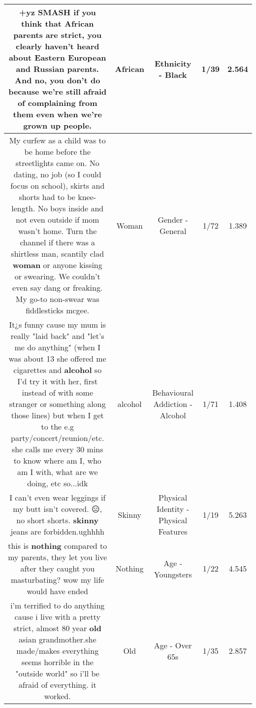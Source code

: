 \documentclass[11pt]{article}
\newlength\mylength
\begin{document}
\begin{center}
\begin{longtable}{|C{.65\mylength}|C{.30\mylength}|C{.12\mylength}|C{.12\mylength}|C{.12\mylength}|}
  \small +yz SMASH if you think that \textbf{African} parents are strict, you clearly haven't heard about Eastern European and Russian parents. And no, you don't do because we're still afraid of complaining from them even when we're grown up people.\normalsize   & African & Ethnicity - Black & 1/39 & 2.564 \\  \hline
  \small My curfew as a child was to be home before the streetlights came on. No dating, no job (so I could focus on school), skirts and shorts had to be knee-length.  No boys inside and not even outside if mom wasn't home.  Turn the channel if there was a shirtless man, scantily clad \textbf{woman} or anyone kissing or swearing.  We couldn't even say dang or freaking.  My go-to non-swear was fiddlesticks mcgee.\normalsize   & Woman & Gender - General & 1/72 & 1.389 \\  \hline
  \small It¿s funny cause my mum is really "laid back" and "let's me do anything" (when I was about 13 she offered me cigarettes and \textbf{alcohol} so I'd try it with her, first instead of with some stranger or something along those lines) but when I get to the e.g party/concert/reunion/etc. she calls me every 30 mins to know where am I, who am I with, what are we doing, etc so...idk\normalsize   & alcohol & Behavioural Addiction - Alcohol & 1/71 & 1.408 \\  \hline
  \small I can't even wear leggings if my butt isn't covered. 😑, no short shorts.  \textbf{skinny} jeans are forbidden.ughhhh\normalsize   & Skinny & Physical Identity - Physical Features & 1/19 & 5.263 \\  \hline
  \small this is \textbf{nothing} compared to my parents, they let you live after they caught you masturbating? wow my life would have ended\normalsize   & Nothing & Age - Youngsters & 1/22 & 4.545 \\  \hline
  \small i'm terrified to do anything cause i live with a pretty strict, almost 80 year \textbf{old} asian grandmother.she made/makes everything seems horrible in the "outside world" so i'll be afraid of everything. it worked.\normalsize   & Old & Age - Over 65s & 1/35 & 2.857 \\  \hline

\end{longtable}
\end{center}
\end{document}
